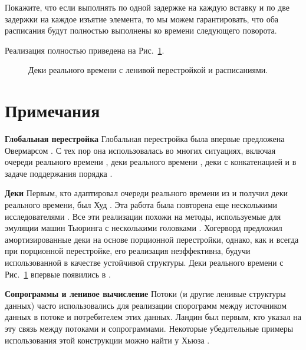 \begin{exercise}\label{ex:8.7}
  Покажите, что если выполнять по одной задержке на каждую вставку и
  по две задержки на каждое изъятие элемента, то мы можем
  гарантировать, что оба расписания будут полностью выполнены ко
  времени следующего поворота.
\end{exercise}

Реализация полностью приведена на Рис.~\ref{fig:8.4}.

\begin{figure}
  \centering
  
  \caption{Деки реального времени с ленивой перестройкой и расписаниями.}
  \label{fig:8.4}
\end{figure}

\section{Примечания}
\label{sc:8.5}

\textbf{Глобальная перестройка} Глобальная перестройка была впервые
предложена Овермарсом \cite{Overmars1983}. С тех пор она
использовалась во многих ситуациях, включая очереди реального времени
\cite{HoodMelville1981}, деки реального времени \cite{Hood1982,
  GajewskaTarjan1986, Sarnak1986, ChuangGoldberg1993}, деки с
конкатенацией \cite{BuchsbaumTarjan1995} и в задаче поддержания
порядка \cite{DietzSleator1987}.

\textbf{Деки} Первым, кто адаптировал очереди реального времени из
\cite{HoodMelville1981} и получил деки реального времени, был Худ
\cite{Hood1982}. Эта работа была повторена еще несколькими
исследователями \cite{GajewskaTarjan1986, Sarnak1986,
  ChuangGoldberg1993}. Все эти реализации похожи на методы,
используемые для эмуляции машин Тьюринга с несколькими головками
\cite{Stoss1970, FischerMeyerRosenberg1972,
  LeongSeiferas1981}. Хогерворд \cite{Hoogerwoord1992} предложил
амортизированные деки на основе порционной перестройки, однако, как и
всегда при порционной перестройке, его реализация
неэффективна, будучи использованной в качестве устойчивой структуры. Деки
реального времени с Рис.~\ref{fig:8.4} впервые появились в
\cite{Okasaki1995c}.

\textbf{Сопрограммы и ленивое вычисление} Потоки (и другие ленивые
структуры данных) часто использовались для реализации спорограмм между
источником данных в потоке и потребителем этих данных. Ландин
\cite{Landin1965} был первым, кто указал на эту связь между потоками и
сопрограммами. Некоторые убедительные примеры использования этой
конструкции можно найти у Хьюза \cite{Hughes1989}.

